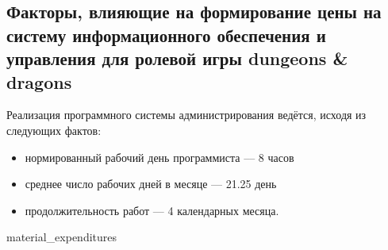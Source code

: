 \subsection{Факторы, влияющие на формирование цены на систему информационного обеспечения и управления для ролевой игры dungeons & dragons}
Реализация программного системы администрирования ведётся, исходя из
следующих фактов:
\begin{itemize}
\item нормированный рабочий день программиста --– 8 часов
\item среднее число рабочих дней в месяце –-- 21.25 день
\item продолжительность работ --- 4 календарных месяца.
\end{itemize}

{material_expenditures}

